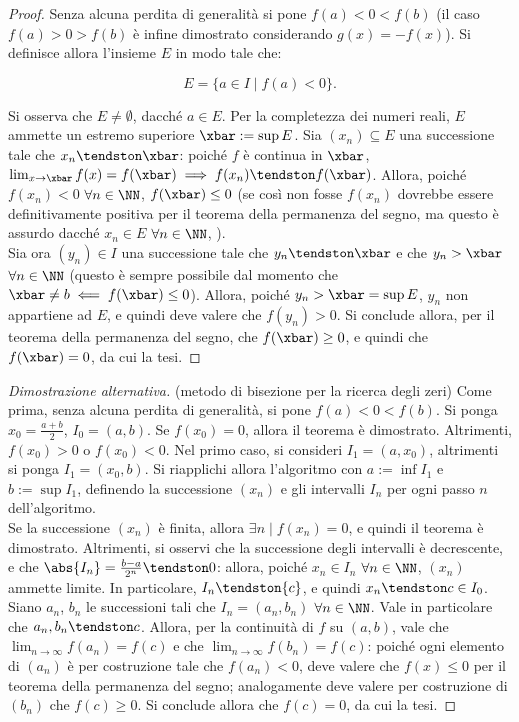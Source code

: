 \documentclass[11pt]{article}
\begin{document}
	\begin{proof}
		Senza alcuna perdita di generalità si pone $f(a) < 0 < f(b)$ (il caso $f(a) > 0 > f(b)$ è
		infine dimostrato considerando $g(x) = -f(x)$). Si definisce allora l'insieme $E$ in modo tale che:
		
		\[ E = \{ a \in I \mid f(a) < 0 \}. \]
		
		\vskip 0.05in
		
		Si osserva che $E \neq \emptyset$, dacché $a \in E$. Per la completezza dei numeri reali,
		$E$ ammette un estremo superiore $\xbar := \sup E$. Sia $(x_n) \subseteq E$ una successione
		tale che $x_n \tendston \xbar$: poiché $f$ è continua in $\xbar$, $\lim_{x \to \xbar} f(x) = f(\xbar) \implies
		f(x_n) \tendston f(\xbar)$. Allora, poiché $f(x_n) < 0$ $\forall n \in \NN$, $f(\xbar) \leq 0$ (se così non fosse
		$f(x_n)$ dovrebbe essere definitivamente positiva per il teorema della permanenza del segno, ma questo
		è assurdo dacché $x_n \in E$ $\forall n \in \NN$, \Lightning). \\
		
		Sia ora $(y_n) \in I$ una successione tale che $y_n \tendston \xbar$ e che $y_n > \xbar$ $\forall n \in \NN$ (questo
		è sempre possibile dal momento che $\xbar \neq b \impliedby f(\xbar) \leq 0$). Allora,
		poiché $y_n > \xbar = \sup E$, $y_n$ non appartiene ad $E$, e quindi deve valere che $f(y_n) > 0$. Si conclude
		allora, per il teorema della permanenza del segno, che $f(\xbar) \geq 0$, e quindi che $f(\xbar) = 0$, da cui
		la tesi.
	\end{proof}

	\begin{proof}[Dimostrazione alternativa] (metodo di bisezione per la ricerca degli zeri)
		Come prima, senza alcuna perdita di generalità, si pone $f(a) < 0 < f(b)$. Si ponga $x_0 = \frac{a+b}{2}$,
		$I_0 = (a, b)$.
		Se $f(x_0) = 0$, allora il teorema è dimostrato. Altrimenti, $f(x_0) > 0$ o $f(x_0) < 0$. Nel primo caso,
		si consideri $I_1 = (a, x_0)$, altrimenti si ponga $I_1 = (x_0, b)$. Si riapplichi allora l'algoritmo con $a := \inf I_1$ e $b := \sup I_1$, definendo la successione $(x_n)$ e gli intervalli $I_n$ per ogni passo $n$ dell'algoritmo. \\
		
		Se la successione $(x_n)$ è finita, allora $\exists n \mid f(x_n) = 0$, e quindi il teorema è dimostrato. Altrimenti,
		si osservi che la successione degli intervalli è decrescente, e che $\abs{I_n} = \frac{b-a}{2^n} \tendston 0$:
		allora, poiché $x_n \in I_n$ $\forall n \in \NN$, $(x_n)$ ammette limite. In particolare, $I_n \tendston \{c\}$,
		e quindi $x_n \tendston c \in I_0$. Siano $a_n$, $b_n$ le successioni tali che $I_n = (a_n, b_n)$ $\forall n \in \NN$.
		Vale in particolare che $a_n, b_n \tendston c$. Allora, per la continuità di $f$ su $(a, b)$, vale che
		$\lim_{n \to \infty} f(a_n) = f(c)$ e che $\lim_{n \to \infty} f(b_n) = f(c)$: poiché ogni elemento di $(a_n)$ è
		per costruzione tale che $f(a_n) < 0$, deve valere che $f(x) \leq 0$ per il teorema della permanenza del segno; analogamente deve valere per costruzione di $(b_n)$ che $f(c) \geq 0$. Si conclude allora che $f(c) = 0$, da cui
		la tesi.
	\end{proof}
\end{document}

